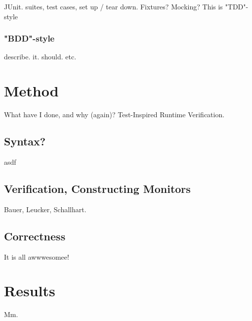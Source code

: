 \documentclass[a4paper,11pt]{kth-mag}
\begin{document}
JUnit. suites, test cases, set up / tear down. Fixtures? Mocking? This is
"TDD"-style

\subsection{"BDD"-style}

describe. it. should. etc.







\pagestyle{newchap}
\chapter{Method} \label{chapter-method}

What have I done, and why (again)? Test-Inspired Runtime Verification.


\section{Syntax?}

asdf

\section{Verification, Constructing Monitors}

Bauer, Leucker, Schallhart.

\section{Correctness}

It is all awwwesomee!





\pagestyle{newchap}
\chapter{Results} \label{chapter-results}

Mm.




\end{document}
